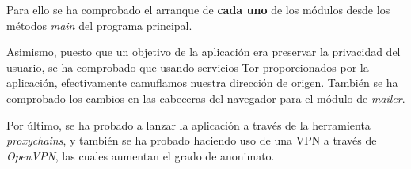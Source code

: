 Para ello se ha comprobado el arranque de \textbf{cada uno} de los módulos desde los métodos \textit{main} del programa principal.

Asimismo, puesto que un objetivo de la aplicación era preservar la privacidad del usuario, se ha comprobado que usando servicios Tor proporcionados por la aplicación, efectivamente camuflamos nuestra dirección de origen. También se ha comprobado los cambios en las cabeceras del navegador para el módulo de \textit{mailer}.

Por último, se ha probado a lanzar la aplicación a través de la herramienta \textit{proxychains}, y también se ha probado haciendo uso de una VPN a través de \textit{OpenVPN}, las cuales aumentan el grado de anonimato.

